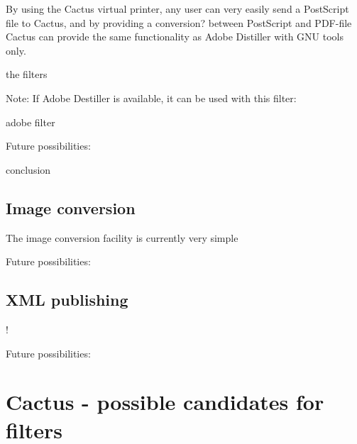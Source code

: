 By using the Cactus virtual printer, any user can very easily send a
PostScript file to Cactus, and by providing a \textsf{conversion?}
between PostScript and PDF-file Cactus can provide the same
functionality as Adobe Distiller with GNU tools only.

\textsf{the filters}

Note:  If Adobe Destiller is available, it can be used with this
filter:

\textsf{adobe filter}

Future possibilities:

\textsf{conclusion}
\section{Image conversion}
\label{sec:image-conversion}

The image conversion facility is currently very simple


Future possibilities:


\section{XML publishing}
\label{sec:xml-publishing}

\textsf{!}

Future possibilities:


\chapter{Cactus - possible candidates for filters}
\label{cha:cactus-possible-candidates-for-filters}













